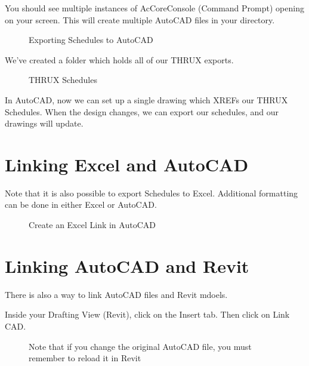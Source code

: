 \documentclass[letterpaper,10pt,english]{sphinxmanual}
\begin{document}
You should see multiple instances of AcCoreConsole (Command Prompt) opening on your screen.  This will create multiple AutoCAD files in your directory.

\begin{figure}[H]
\centering
\capstart

\noindent{}
\caption{Exporting Schedules to AutoCAD}\label{\detokenize{index:id7}}\end{figure}

We’ve created a folder which holds all of our THRUX exports.

\begin{figure}[H]
\centering
\capstart

\noindent{}
\caption{THRUX Schedules}\label{\detokenize{index:id8}}\end{figure}

In AutoCAD, now we can set up a single drawing which XREFs our THRUX Schedules.  When the design changes, we can export our schedules, and our drawings will update.

\newpage


\section{Linking Excel and AutoCAD}
\label{\detokenize{index:linking-excel-and-autocad}}
Note that it is also possible to export Schedules to Excel.  Additional formatting can be done in either Excel or AutoCAD.

\begin{figure}[H]
\centering
\capstart

\noindent{}
\caption{Create an Excel Link in AutoCAD}\label{\detokenize{index:id9}}\end{figure}


\section{Linking AutoCAD and Revit}
\label{\detokenize{index:linking-autocad-and-revit}}
There is also a way to link AutoCAD files and Revit mdoels.

Inside your Drafting View (Revit), click on the Insert tab.  Then click on Link CAD.

\begin{figure}[H]
\centering
\capstart

\noindent{}
\caption{Note that if you change the original AutoCAD file, you must remember to reload it in Revit}\label{\detokenize{index:id10}}\end{figure}
\end{document}
